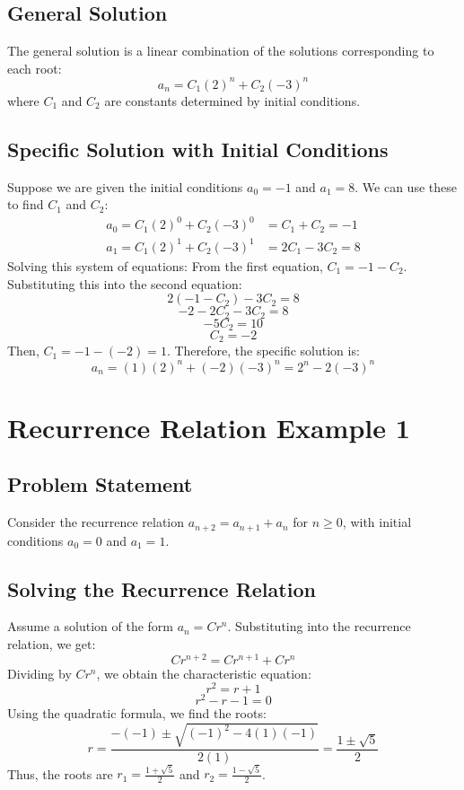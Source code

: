 \documentclass{report}
\begin{document}
\subsection{General Solution}

The general solution is a linear combination of the solutions corresponding to each root:
$$a_n = C_1(2)^n + C_2(-3)^n$$
where $C_1$ and $C_2$ are constants determined by initial conditions.

\subsection{Specific Solution with Initial Conditions}

Suppose we are given the initial conditions $a_0 = -1$ and $a_1 = 8$. We can use these to find $C_1$ and $C_2$:
\begin{align*}
	a_0 = C_1(2)^0 + C_2(-3)^0 & = C_1 + C_2 = -1  \\
	a_1 = C_1(2)^1 + C_2(-3)^1 & = 2C_1 - 3C_2 = 8
\end{align*}
Solving this system of equations:
From the first equation, $C_1 = -1 - C_2$. Substituting this into the second equation:
$$2(-1 - C_2) - 3C_2 = 8$$
$$-2 - 2C_2 - 3C_2 = 8$$
$$-5C_2 = 10$$
$$C_2 = -2$$
Then, $C_1 = -1 - (-2) = 1$.
Therefore, the specific solution is:
$$a_n = (1)(2)^n + (-2)(-3)^n = 2^n - 2(-3)^n$$

\section{Recurrence Relation Example 1}

\subsection{Problem Statement}

Consider the recurrence relation $a_{n+2} = a_{n+1} + a_n$ for $n \geq 0$, with initial conditions $a_0 = 0$ and $a_1 = 1$.

\subsection{Solving the Recurrence Relation}

Assume a solution of the form $a_n = Cr^n$. Substituting into the recurrence relation, we get:
$$Cr^{n+2} = Cr^{n+1} + Cr^n$$
Dividing by $Cr^n$, we obtain the characteristic equation:
$$r^2 = r + 1$$
$$r^2 - r - 1 = 0$$
Using the quadratic formula, we find the roots:
$$r = \frac{-(-1) \pm \sqrt{(-1)^2 - 4(1)(-1)}}{2(1)} = \frac{1 \pm \sqrt{5}}{2}$$
Thus, the roots are $r_1 = \frac{1 + \sqrt{5}}{2}$ and $r_2 = \frac{1 - \sqrt{5}}{2}$.
\end{document}
